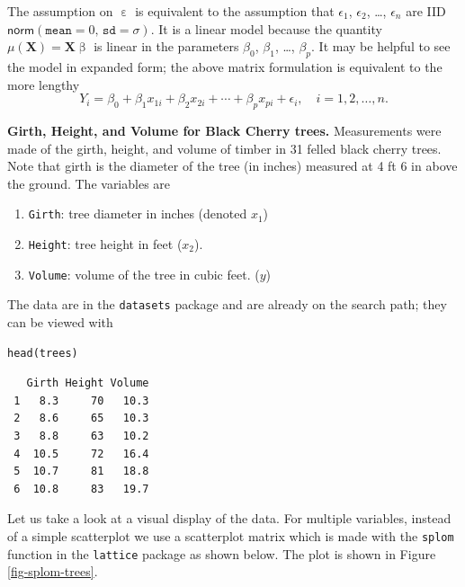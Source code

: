 \documentclass[captions=tableheading]{scrbook}
\begin{document}
The assumption on \(\upepsilon\) is equivalent to the assumption that \(\epsilon_{1}\), \(\epsilon_{2}\), \ldots{}, \(\epsilon_{n}\) are IID \(\mathsf{norm}(\mathtt{mean}=0,\,\mathtt{sd}=\sigma)\). It is a linear model because the quantity \(\mu(\mathbf{X})=\mathbf{X}\upbeta\) is linear in the parameters \(\beta_{0}\), \(\beta_{1}\), \ldots{}, \(\beta_{p}\). It may be helpful to see the model in expanded form; the above matrix formulation is equivalent to the more lengthy
\begin{equation} 
Y_{i}=\beta_{0}+\beta_{1}x_{1i}+\beta_{2}x_{2i}+\cdots+\beta_{p}x_{pi}+\epsilon_{i},\quad i=1,2,\ldots,n.
\end{equation}

\begin{example}
\textbf{Girth, Height, and Volume for Black Cherry trees.} 
Measurements were made of the girth, height, and volume of timber in 31 felled black cherry trees. Note that girth is the diameter of the tree (in inches) measured at 4 ft 6 in above the ground. The variables are

\begin{enumerate}
\item \texttt{Girth}: tree diameter in inches (denoted \(x_{1}\))
\item \texttt{Height}: tree height in feet (\(x_{2}\)).
\item \texttt{Volume}: volume of the tree in cubic feet. (\(y\))
\end{enumerate}

The data are in the \texttt{datasets} package and are already on the search path; they can be viewed with


\lstset{language=R}
\begin{lstlisting}
head(trees)
\end{lstlisting}

\begin{verbatim}
   Girth Height Volume
 1   8.3     70   10.3
 2   8.6     65   10.3
 3   8.8     63   10.2
 4  10.5     72   16.4
 5  10.7     81   18.8
 6  10.8     83   19.7
\end{verbatim}

Let us take a look at a visual display of the data. For multiple variables, instead of a simple scatterplot we use a scatterplot matrix which is made with the \texttt{splom} function in the \texttt{lattice} package \cite{Sarkarlattice} as shown below. The plot is shown in Figure \ref{fig-splom-trees}.



\end{example}
\end{document}
